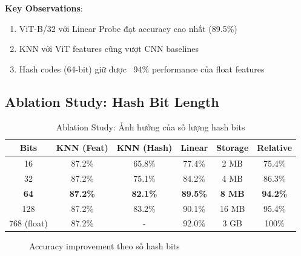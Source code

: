 \documentclass[12pt,a4paper]{article}
\begin{document}
\textbf{Key Observations}:
\begin{enumerate}
    \item ViT-B/32 với Linear Probe đạt accuracy cao nhất (89.5\%)
    \item KNN với ViT features cũng vượt CNN baselines
    \item Hash codes (64-bit) giữ được ~94\% performance của float features
\end{enumerate}

\subsection{Ablation Study: Hash Bit Length}

\begin{table}[H]
\centering
\caption{Ablation Study: Ảnh hưởng của số lượng hash bits}
\label{tab:ablation}
\begin{tabular}{c|ccc|cc}
\toprule
\textbf{Bits} & \textbf{KNN (Feat)} & \textbf{KNN (Hash)} & \textbf{Linear} & \textbf{Storage} & \textbf{Relative} \\
\midrule
16 & 87.2\% & 65.8\% & 77.4\% & 2 MB & 75.4\% \\
32 & 87.2\% & 75.1\% & 84.2\% & 4 MB & 86.3\% \\
\textbf{64} & \textbf{87.2\%} & \textbf{82.1\%} & \textbf{89.5\%} & \textbf{8 MB} & \textbf{94.2\%} \\
128 & 87.2\% & 83.2\% & 90.1\% & 16 MB & 95.4\% \\
\midrule
768 (float) & 87.2\% & - & 92.0\% & 3 GB & 100\% \\
\bottomrule
\end{tabular}
\end{table}

\begin{figure}[H]
\centering
{}
\caption{Accuracy improvement theo số hash bits}
\end{figure}
\end{document}
